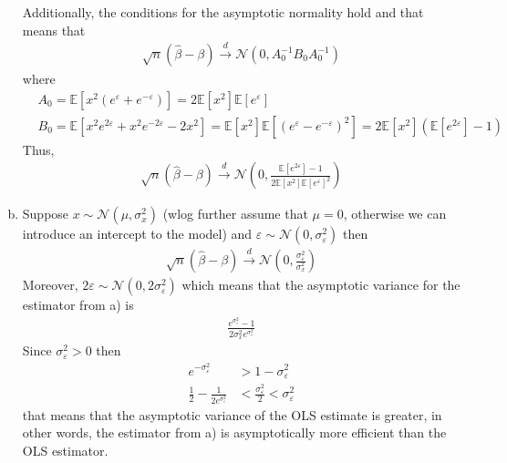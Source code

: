 \documentclass[a4paper]{article}
\newcommand{\norma}{\mathcal{N}}
\newcommand{\expect}{\mathbb{E}}
\begin{document}
\begin{enumerate}[a)]
	Additionally, the conditions for the asymptotic normality hold and that means that
	\begin{align*}
	\sqrt{n}(\hat{\beta} - \beta) \overset{d}{\to} \norma(0, A_0^{-1}B_0A_0^{-1})
	\end{align*}
	where
	\begin{align*}
	&A_0 = \expect[x^2(e^{\varepsilon} + e^{-\varepsilon})] = 2\expect[x^2] \expect[e^{\varepsilon}]\\
	&B_0 = \expect[x^2e^{2\varepsilon} + x^2e^{-2\varepsilon} - 2x^2] = \expect[x^2]\expect[(e^{\varepsilon} - e^{-\varepsilon})^2] = 2\expect[x^2](\expect[e^{2\varepsilon}] - 1)
	\end{align*}
	Thus,
	\begin{align*}
	\sqrt{n}(\hat{\beta} - \beta) \overset{d}{\to} \norma\left(0, \frac{\expect[e^{2 \varepsilon}]-1}{2\expect[x^2]\expect[e^{\varepsilon}]^2}\right)
	\end{align*}
	\item Suppose $x \sim \norma(\mu, \sigma_x^2)$ (wlog further assume that $\mu = 0$, otherwise we can introduce an intercept to the model) and $\varepsilon \sim \norma(0, \sigma^2_{\varepsilon})$ then
	\begin{align*}
	\sqrt{n}(\hat{\beta} - \beta) \overset{d}{\to} \norma\left(0, \frac{\sigma_{\varepsilon}^2}{\sigma^2_{x}}\right)
	\end{align*}
	Moreover, $2\varepsilon \sim \norma(0, 2\sigma^2_{\varepsilon})$ which means that the asymptotic variance for the estimator from a) is 
	\begin{align*}
	\frac{e^{\sigma^2_{\varepsilon}}-1}{2\sigma^2_xe^{\sigma^2_{\varepsilon}}}
	\end{align*}
	Since $\sigma^2_{\varepsilon} > 0$ then 
	\begin{align*}
	e^{-\sigma^2_{\varepsilon}} &> 1 - \sigma^2_{\varepsilon}\\
	\frac{1}{2} - \frac{1}{2e^{\sigma^2_{\varepsilon}}} &< \frac{\sigma^2_{\varepsilon}}{2} < \sigma^2_{\varepsilon}
	\end{align*}
	that means that the asymptotic variance of the OLS estimate is greater, in other words, the estimator from a) is asymptotically more efficient than the OLS estimator.
\end{enumerate}
\end{document}
